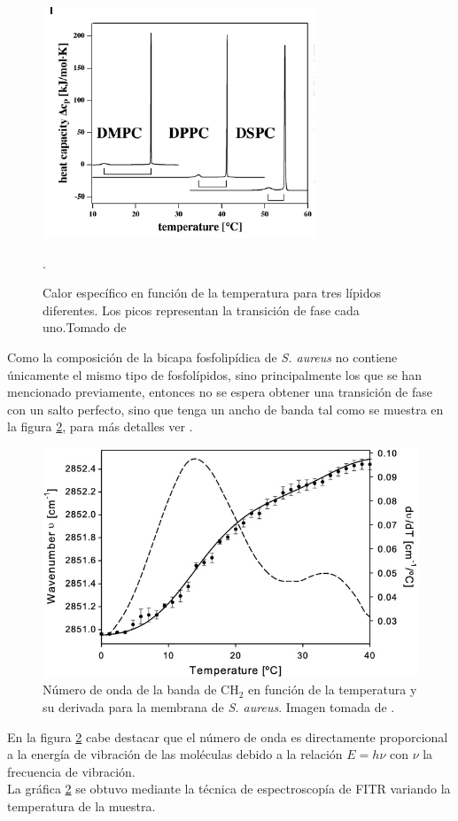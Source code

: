 \documentclass[12pt]{article}
\begin{document}
\begin{figure}[h]
\begin{center}
  \includegraphics[scale=0.5]{cp.png}
  \caption{ Calor espec\'ifico en funci\'on de la temperatura para tres l\'ipidos diferentes. Los picos representan la transici\'on de fase cada uno.Tomado de \cite{Heimburg}}.
  \label{fig:esp3}
  \end{center}
\end{figure}
 Como la composici\'on de la bicapa fosfolip\'idica de \textit{S. aureus} no contiene \'unicamente el mismo tipo de fosfol\'ipidos, sino principalmente los que se han mencionado previamente, entonces no se espera obtener una transici\'on de fase con un salto perfecto, sino que tenga un ancho de banda tal como se muestra en la figura \ref{fig:ent2}, para m\'as detalles ver \cite{Ocampo2010TheAureus}.\\
\begin{figure}[h]
\begin{center}
  \includegraphics[scale=0.3]{transicion.png}
  \caption{ N\'umero de onda de la banda de CH$_{2}$ en funci\'on de la temperatura y su derivada para la membrana de \textit{S. aureus}. Imagen tomada de \cite{Ocampo2010TheAureus}.}
  \label{fig:ent2}
  \end{center}
\end{figure}
En la figura \ref{fig:ent2} cabe destacar que el n\'umero de onda es directamente proporcional a la energ\'ia de vibraci\'on de las mol\'eculas debido a la relaci\'on $E=h\nu$ con $\nu$ la frecuencia de vibraci\'on.\\
La gr\'afica \ref{fig:ent2} se obtuvo mediante la t\'ecnica de espectroscop\'ia de FITR variando la temperatura de la muestra.
\end{document}
